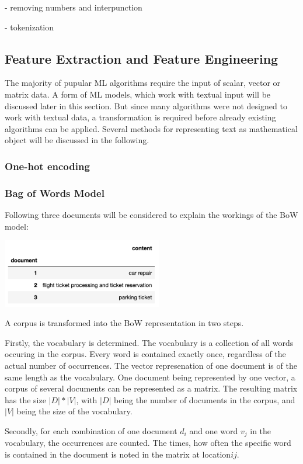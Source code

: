 	- removing numbers and interpunction
	
	- tokenization
	
	\subsection{Feature Extraction and Feature Engineering}
	The majority of pupular ML algorithms require the input of scalar, vector or matrix data. A form of ML models, which work with textual input will be discussed later in this section. 
	But since many algorithms were not designed to work with textual data, a transformation is required before already existing algorithms can be applied. Several methods for representing text as mathematical object will be discussed in the following.

		\subsubsection{One-hot encoding}
		

		\subsubsection{Bag of Words Model}
		Following three documents will be considered to explain the workings of the \ac{BoW} model:

		\includegraphics[height=3cm]{Bilder/corpus_bow.png}
		
		A corpus is transformed into the \ac{BoW} representation in two steps. 
		
		Firstly, the vocabulary is determined. 
		The vocabulary is a collection of all words occuring in the corpus. Every word is contained exactly once, regardless of the actual number of occurrences. The vector represenation of one document is of the same length as the vocabulary. One document being represented by one vector, a corpus of several documents can be represented as a matrix. The resulting matrix has the size $ |D|*|V| $, with $|D|$ being the number of documents in the corpus, and $|V|$ being the size of the vocabulary.
		
		Secondly, for each combination of one document $ d_{i} $ and one word $ v_{j} $ in the vocabulary, the occurrences are counted. The times, how often the specific word is contained in the document is noted in the matrix at location$  ij $.
		
